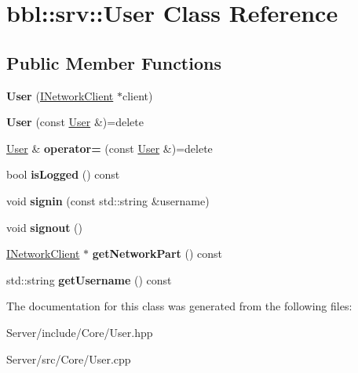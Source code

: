 \hypertarget{classbbl_1_1srv_1_1_user}{}\section{bbl\+:\+:srv\+:\+:User Class Reference}
\label{classbbl_1_1srv_1_1_user}
\subsection*{Public Member Functions}
\begin{DoxyCompactItemize}
\item 
\mbox{\label{classbbl_1_1srv_1_1_user_a3cd17454b095a77a93d8690ab23f0cec}} 
{\bfseries User} (\hyperlink{classbbl_1_1srv_1_1_i_network_client}{I\+Network\+Client} $\ast$client)
\item 
\mbox{\label{classbbl_1_1srv_1_1_user_a2b40e9a0073dc74113a8d9bce7f374f7}} 
{\bfseries User} (const \hyperlink{classbbl_1_1srv_1_1_user}{User} \&)=delete
\item 
\mbox{\label{classbbl_1_1srv_1_1_user_a0ca22704d3257634862b7a3b1ebe3a32}} 
\hyperlink{classbbl_1_1srv_1_1_user}{User} \& {\bfseries operator=} (const \hyperlink{classbbl_1_1srv_1_1_user}{User} \&)=delete
\item 
\mbox{\label{classbbl_1_1srv_1_1_user_a58d16c117e5c0577c793364496e78e20}} 
bool {\bfseries is\+Logged} () const
\item 
\mbox{\label{classbbl_1_1srv_1_1_user_a65d32b6a769c1f7493a5cdf8336e8c87}} 
void {\bfseries signin} (const std\+::string \&username)
\item 
\mbox{\label{classbbl_1_1srv_1_1_user_aad7ac7230675f32b0e6591ee704eb222}} 
void {\bfseries signout} ()
\item 
\mbox{\label{classbbl_1_1srv_1_1_user_acfe468fe594824191a57d1497f3fa439}} 
\hyperlink{classbbl_1_1srv_1_1_i_network_client}{I\+Network\+Client} $\ast$ {\bfseries get\+Network\+Part} () const
\item 
\mbox{\label{classbbl_1_1srv_1_1_user_a7079d6aefd9d1b930d837039c1b3e7df}} 
std\+::string {\bfseries get\+Username} () const
\end{DoxyCompactItemize}


The documentation for this class was generated from the following files\+:\begin{DoxyCompactItemize}
\item 
Server/include/\+Core/User.\+hpp\item 
Server/src/\+Core/User.\+cpp\end{DoxyCompactItemize}
